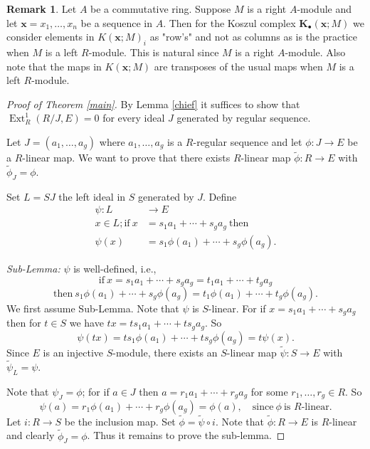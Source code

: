 \documentclass{amsart}
\theoremstyle{plain}
\theoremstyle{definition}
\newtheorem{remark}[theorem]{Remark}
\theoremstyle{remark}
\numberwithin{equation}{theorem}
\begin{document}
\begin{remark}\label{right}
Let $A$ be a commutative ring.
Suppose $M$ is a right $A$-module and let ${\mathbf{x}} = x_1,\ldots,x_n$ be a  sequence in $A$. Then for the Koszul complex
${\mathbf{K}_{\bullet} }({\mathbf{x}};M)$ we consider elements in $K({\mathbf{x}};M)_i$ as "row's" and not as columns as is the practice when $M$ is a left $R$-module. This is natural since $M$ is a right $A$-module. Also note that the maps in $K({\mathbf{x}};M)$ are transposes of the usual maps when $M$ is a left $R$-module.
\end{remark}
\begin{proof}[Proof of Theorem \ref{main}]
By Lemma \ref{chief} it suffices to show that ${\operatorname{Ext}}_{R}^{1}(R/J,E) = 0$ for every ideal $J$
 generated by regular sequence.

 Let $J = (a_1,\ldots,a_g)$ where $a_1,\ldots,a_g$ is a $R$-regular sequence and let $\phi \colon J {\rightarrow} E$ be a $R$-linear map. We want to prove that  there exists $R$-linear map $\widetilde{\phi} \colon R {\rightarrow} E$ with $\widetilde{\phi}_J = \phi$.

 Set $L = SJ$ the left ideal in $S$ generated by $J$. Define
 \begin{align*}
 \psi \colon L &{\rightarrow} E \\
 x \in L; \text{if} \ x &= s_1a_1 + \cdots + s_ga_g \ \text{then}\\
 \psi(x) &= s_1\phi(a_1) + \cdots + s_g\phi(a_g).
 \end{align*}

\textit{Sub-Lemma:}  $\psi$ is well-defined, i.e.,
\[
 \text{if} \ x = s_1a_1 + \cdots + s_ga_g = t_1a_1 + \cdots + t_ga_g
\]
\[
\text{then} \ s_1\phi(a_1) + \cdots + s_g\phi(a_g) = t_1\phi(a_1) + \cdots + t_g\phi(a_g).
\]
We first assume Sub-Lemma. Note that $\psi$ is $S$-linear. For if $x =  s_1a_1 + \cdots + s_ga_g$
then for $t \in S$ we have $tx = ts_1 a_1 + \cdots + t s_g a_g$. So
\[
\psi(tx) = ts_1\phi(a_1) + \cdots + ts_g\phi(a_g) = t \psi(x).
\]
Since $E$ is an injective $S$-module, there exists an $S$-linear map $\widetilde{\psi} \colon S {\rightarrow} E$ with $\widetilde{\psi}_L = \psi$.

Note that $\psi_J = \phi$; for if $a \in J$ then $a = r_1 a_1 + \cdots + r_g a_g$ for some $r_1,\ldots,r_g \in R$.
So
\[
\psi(a) = r_1\phi(a_1) + \cdots + r_g\phi(a_g) = \phi(a), \quad \text{since} \ \phi \ \text{is $R$-linear}.
\]
Let $i \colon R {\rightarrow} S$ be the inclusion map. Set $\widetilde{\phi} = \widetilde{\psi} \circ i$. Note that
$\widetilde{\phi} \colon R {\rightarrow} E$ is $R$-linear and clearly $\widetilde{\phi}_J = \phi$. Thus it remains to prove the
sub-lemma.


\end{proof}
\end{document}

